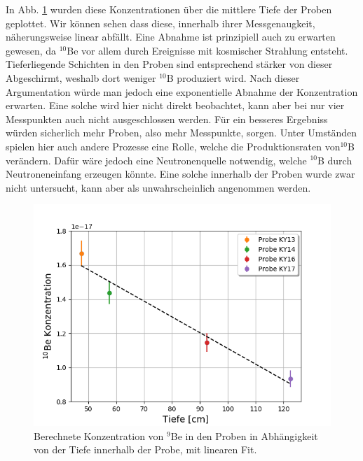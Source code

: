 In Abb. \ref{deep} wurden diese Konzentrationen über die mittlere Tiefe der Proben geplottet.
Wir können sehen dass diese, innerhalb ihrer Messgenaugkeit, näherungsweise linear abfällt.
Eine Abnahme ist prinzipiell auch zu erwarten gewesen, da $^{10}$Be vor allem durch Ereignisse mit kosmischer Strahlung entsteht.
Tieferliegende Schichten in den Proben sind entsprechend stärker von dieser Abgeschirmt, weshalb dort weniger $^{10}$B produziert wird.
Nach dieser Argumentation würde man jedoch eine exponentielle Abnahme der Konzentration erwarten.
Eine solche wird hier nicht direkt beobachtet, kann aber bei nur vier Messpunkten auch nicht ausgeschlossen werden.
Für ein besseres Ergebniss würden sicherlich mehr Proben, also mehr Messpunkte, sorgen.
Unter Umständen spielen hier auch andere Prozesse eine Rolle, welche die Produktionsraten von$^{10}$B verändern.
Dafür wäre jedoch eine Neutronenquelle notwendig, welche $^{10}$B durch Neutroneneinfang erzeugen könnte.
Eine solche innerhalb der Proben wurde zwar nicht untersucht, kann aber als unwahrscheinlich angenommen werden.

\begin{figure}[ht]
  \centering
  \includegraphics[width=0.7\linewidth]{Pictures/10be_konzentration.png}
  \caption{Berechnete Konzentration von $^9$Be in den Proben in Abhängigkeit von der Tiefe innerhalb der Probe, mit linearen Fit.}
  \label{deep}
\end{figure}
